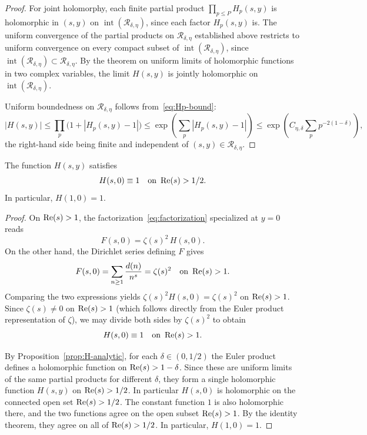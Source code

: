 \begin{proof}
For joint holomorphy, each finite partial product
$\prod_{p \leq P} H_p(s, y)$ is holomorphic in $(s, y)$ on
$\operatorname{int}(\mathcal{R}_{\delta, \eta})$, since each factor
$H_p(s, y)$ is. The uniform convergence of the partial products on
$\mathcal{R}_{\delta, \eta}$ established above restricts to uniform
convergence on every compact subset of
$\operatorname{int}(\mathcal{R}_{\delta, \eta})$, since
$\operatorname{int}(\mathcal{R}_{\delta, \eta}) \subset
\mathcal{R}_{\delta, \eta}$. By the theorem on uniform limits of
holomorphic functions in two complex variables, the limit
$H(s, y)$ is jointly holomorphic on
$\operatorname{int}(\mathcal{R}_{\delta, \eta})$.

Uniform boundedness on $\mathcal{R}_{\delta, \eta}$ follows
from~\eqref{eq:Hp-bound}:
\[
    |H(s, y)|
    \leq \prod_p \bigl(1 + |H_p(s, y) - 1|\bigr)
    \leq \exp\left(\sum_p |H_p(s, y) - 1|\right)
    \leq \exp\left(C_{\eta, \delta} \sum_p p^{-2(1-\delta)}\right),
\]
the right-hand side being finite and independent of
$(s, y) \in \mathcal{R}_{\delta, \eta}$.
\end{proof}



\begin{lemma}\label{prop:H-at-zero}
The function $H(s, y)$ satisfies
\begin{equation}\label{eq:H-at-y-zero}
    H(s, 0) \equiv 1 \quad \text{on } \operatorname{Re}(s) > 1/2.
\end{equation}
In particular, $H(1, 0) = 1$.
\end{lemma}

\begin{proof}
On $\operatorname{Re}(s) > 1$, the factorization~\eqref{eq:factorization}
specialized at $y = 0$ reads
\[
    F(s, 0) = \zeta(s)^2 \, H(s, 0).
\]
On the other hand, the Dirichlet series defining $F$ gives
\[
    F(s, 0) = \sum_{n \geq 1} \frac{d(n)}{n^s} = \zeta(s)^2
    \quad \text{on } \operatorname{Re}(s) > 1.
\]
Comparing the two expressions yields
$\zeta(s)^2 H(s, 0) = \zeta(s)^2$ on $\operatorname{Re}(s) > 1$. Since
$\zeta(s) \neq 0$ on $\operatorname{Re}(s) > 1$ (which follows directly from
the Euler product representation of $\zeta$), we may divide both
sides by $\zeta(s)^2$ to obtain
\[
    H(s, 0) \equiv 1 \quad \text{on } \operatorname{Re}(s) > 1.
\]

By Proposition~\ref{prop:H-analytic}, for each $\delta \in (0, 1/2)$
the Euler product defines a holomorphic function on
$\operatorname{Re}(s) > 1 - \delta$. Since these are uniform limits of the same
partial products for different $\delta$, they form a single
holomorphic function $H(s, y)$ on $\operatorname{Re}(s) > 1/2$.
In particular $H(s, 0)$ is holomorphic on the connected open set $\operatorname{Re}(s) > 1/2$.
The constant function $1$ is also holomorphic
there, and the two functions agree on the open subset
$\operatorname{Re}(s) > 1$. By the identity theorem, they agree on all of
$\operatorname{Re}(s) > 1/2$. In particular, $H(1, 0) = 1$.
\end{proof}

